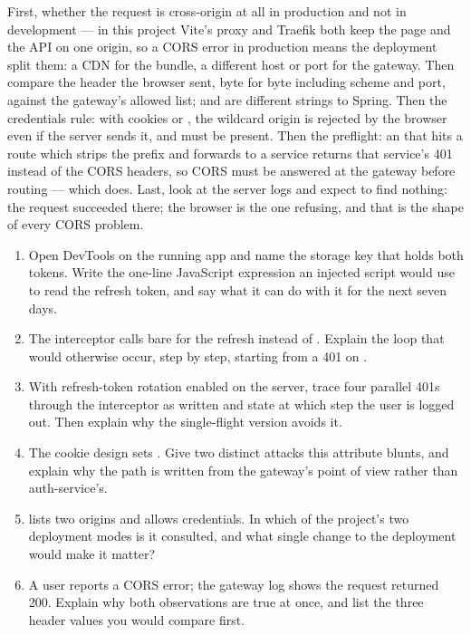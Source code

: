First, whether the request is cross-origin at all in production and not
in development --- in this project Vite's proxy and Traefik both keep
the page and the API on one origin, so a CORS error in production means
the deployment split them: a CDN for the bundle, a different host or
port for the gateway. Then compare the  header the browser
sent, byte for byte including scheme and port, against the gateway's
allowed list;  and
 are different strings to Spring. Then
the credentials rule: with cookies or , the
wildcard origin is rejected by the browser even if the server sends it,
and  must be present. Then
the preflight: an  that hits a route which strips the
prefix and forwards to a service returns that service's 401 instead of
the CORS headers, so CORS must be answered at the gateway before
routing --- which  does. Last, look at the server
logs and expect to find nothing: the request succeeded there; the
browser is the one refusing, and that is the shape of every CORS
problem.

\begin{quiz}
\begin{enumerate}
  \item Open DevTools on the running app and name the storage key that
  holds both tokens. Write the one-line JavaScript expression an
  injected script would use to read the refresh token, and say what it
  can do with it for the next seven days.
  \item The interceptor calls bare  for the refresh
  instead of . Explain the loop that would otherwise
  occur, step by step, starting from a 401 on .
  \item With refresh-token rotation enabled on the server, trace four
  parallel 401s through the interceptor as written and state at which
  step the user is logged out. Then explain why the single-flight
  version avoids it.
  \item The cookie design sets . Give two
  distinct attacks this attribute blunts, and explain why the path is
  written from the gateway's point of view rather than
  auth-service's.
  \item {} lists two origins and allows credentials. In
  which of the project's two deployment modes is it consulted, and what
  single change to the deployment would make it matter?
  \item A user reports a CORS error; the gateway log shows the request
  returned 200. Explain why both observations are true at once, and
  list the three header values you would compare first.
\end{enumerate}
\end{quiz}
